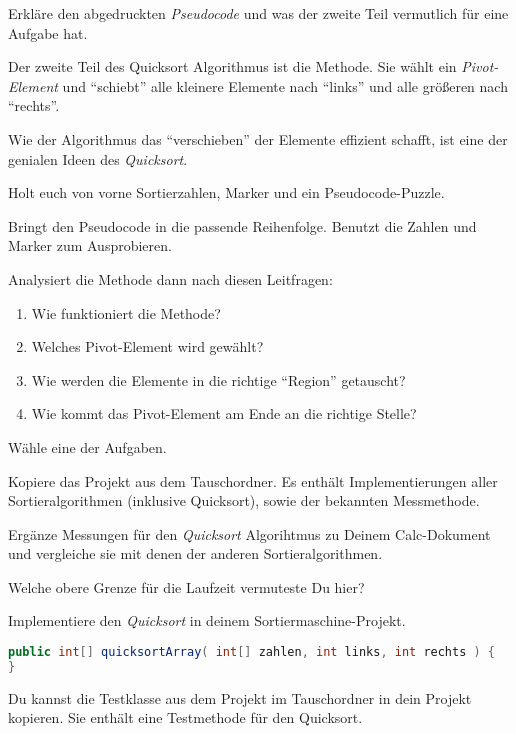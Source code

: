 \documentclass[10pt, a5paper, landscape]{scrartcl}
\begin{document}
\begin{aufgabe}
 Erkläre den abgedruckten \emph{Pseudocode} und was der zweite Teil  vermutlich für eine Aufgabe hat.
\end{aufgabe}

\clearpage
\TITEL[Quicksort 3]

Der zweite Teil des Quicksort Algorithmus ist die  Methode. Sie wählt ein \emph{Pivot-Element} und \enquote{schiebt} alle kleinere Elemente nach \enquote{links} und alle größeren nach \enquote{rechts}.

Wie der Algorithmus das \enquote{verschieben} der Elemente effizient schafft, ist eine der genialen Ideen des \emph{Quicksort}.

\begin{aufgabe}
	Holt euch von vorne Sortierzahlen, Marker und ein Pseudocode-Puzzle. 
	
	Bringt den Pseudocode in die passende Reihenfolge. Benutzt die Zahlen und Marker zum Ausprobieren. 
	
	Analysiert die Methode dann nach diesen Leitfragen:
	\begin{enumerate}
		\item Wie funktioniert die  Methode?
		\item Welches Pivot-Element wird gewählt?
		\item Wie werden die Elemente in die richtige \enquote{Region} getauscht?
		\item Wie kommt das Pivot-Element am Ende an die richtige Stelle?
	\end{enumerate}
\end{aufgabe}

\clearpage
\TITEL[Quicksort 4]

Wähle eine der Aufgaben.

\begin{aufgabe}[subtitle=Laufzeitmessung]
	Kopiere das Projekt  aus dem Tauschordner. Es enthält Implementierungen aller Sortieralgorithmen (inklusive Quicksort), sowie der bekannten Messmethode. 
	
	Ergänze Messungen für den \emph{Quicksort} Algorihtmus zu Deinem Calc-Dokument und vergleiche sie mit denen der anderen Sortieralgorithmen.
	
	Welche obere Grenze für die Laufzeit vermuteste Du hier?
\end{aufgabe}

\begin{aufgabe}[subtitle=Implementierung für gute Programmierer]
	Implementiere den \emph{Quicksort} in deinem Sortiermaschine-Projekt.
	\begin{lstlisting}[language=Java]
public int[] quicksortArray( int[] zahlen, int links, int rechts ) {
}
	\end{lstlisting}
	
	 Du kannst die Testklasse aus dem Projekt  im Tauschordner in dein Projekt kopieren. Sie enthält eine Testmethode für den Quicksort.
\end{aufgabe}
\end{document}
